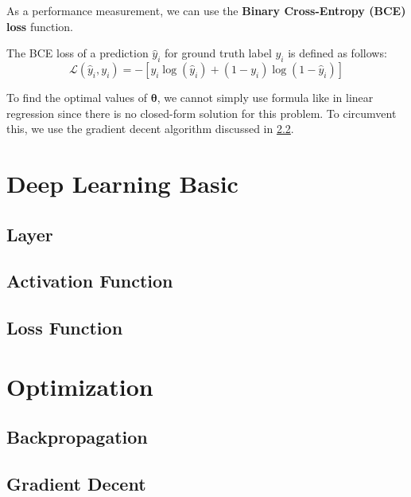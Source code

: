 \documentclass[10pt]{article}
\begin{document}
As a performance measurement, we can use the \textbf{Binary 
Cross-Entropy (BCE) loss} function.

\begin{definition}
    The BCE loss of a prediction $\hat{y}_i$ for ground truth label $y_i$ 
    is defined as follows:
    \begin{equation*}
        \mathcal{L}(\hat{y}_i, y_i) = - \left[ y_i \log(\hat{y}_i) + (1 - y_i) \log(1 - \hat{y}_i) \right]
    \end{equation*}
\end{definition}

To find the optimal values of $\pmb\theta$, we cannot simply use formula 
like in linear regression since there is no closed-form solution 
for this problem. To circumvent this, we use the gradient decent 
algorithm discussed in \cref{sec:optimization:sub:gradientdecent}.

\newpage

\section{Deep Learning Basic}


\subsection{Layer}

\subsection{Activation Function}

\subsection{Loss Function}

\section{Optimization}

\subsection{Backpropagation}

\subsection{Gradient Decent}
\label{sec:optimization:sub:gradientdecent}
\end{document}
